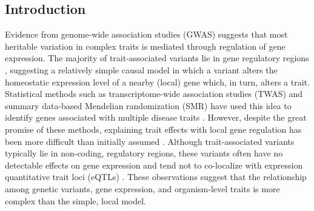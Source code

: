 \documentclass[
]{article}
\begin{document}
\subsection{Introduction}\label{introduction}

Evidence from genome-wide association studies (GWAS) suggests that most
heritable variation in complex traits is mediated through regulation of
gene expression. The majority of trait-associated variants lie in gene
regulatory regions
\cite{pmid22955828, pmid25363779, pmid21617055, pmid19474294, 
pmid24702953, pmid24316577, pmid27126046}, suggesting a relatively
simple causal model in which a variant alters the homeostatic expression
level of a nearby (local) gene which, in turn, alters a trait.
Statistical methods such as transcriptome-wide association studies
(TWAS) \cite{pmid33020666, pmid26258848, pmid27019110, pmid26854917} and
summary data-based Mendelian randomization (SMR) \cite{pmid27019110}
have used this idea to identify genes associated with multiple disease
traits \cite{pmid29567659, 
pmid35533209,  pmid27309819, pmid30950127}. However, despite the great
promise of these methods, explaining trait effects with local gene
regulation has been more difficult than initially assumed
\cite{pmid32912663, pmid36515579}. Although trait-associated variants
typically lie in non-coding, regulatory regions, these variants often
have no detectable effects on gene expression \cite{pmid32912663} and
tend not to co-localize with expression quantitative trait loci (eQTLs)
\cite{pmid36515579, pmid37857933}. These observations suggest that the
relationship among genetic variants, gene expression, and organism-level
traits is more complex than the simple, local model.
\end{document}
